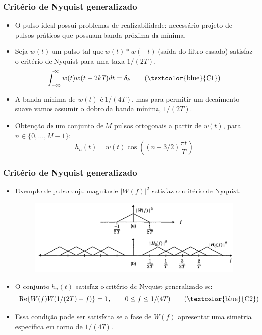 \begin{frame}
	\frametitle{Critério de Nyquist generalizado}

	\begin{itemize}
	    \item O pulso ideal possui problemas de realizabilidade: necessário projeto de pulsos práticos que possuam banda próxima da mínima.
	    \item Seja $w(t)$ um pulso tal que $w(t)*w(-t)$ (saída do filtro casado) satisfaz o critério de Nyquist para uma taxa $1/(2T)$.
	    \begin{equation*}
		\int_{-\infty}^{\infty} w(t) w(t-2kT)dt = \delta_k \qquad \text{(\textcolor{blue}{C1})}
	    \end{equation*}
	    \item A banda mínima de $w(t)$ é $1/(4T)$, mas para permitir um decaimento suave vamos assumir o dobro da banda mínima, $1/(2T)$.
	    \item Obtenção de um conjunto de $M$ pulsos ortogonais a partir de $w(t)$, para $n\in \{0,\ldots, M-1 \}$:
	    \begin{equation*}
		h_n(t) = w(t) \cos \left( (n+3/2) \frac{\pi t}{T} \right) 
	    \end{equation*}
	\end{itemize}	
\end{frame}

\begin{frame}
	\frametitle{Critério de Nyquist generalizado}

	\begin{itemize}
	    \item Exemplo de pulso cuja magnitude $|W(f)|^2$ satisfaz o critério de Nyquist:
	    \begin{figure}[t]	
		\begin{center}
		\includegraphics[width=0.8\columnwidth]{figs/adv_13}
		\end{center}
	    \end{figure}
	    \item O conjunto $h_n(t)$ satisfaz o critério de Nyquist generalizado se:
	    \begin{equation*}
		\mathrm{Re}\{W(f) W(1/(2T)-f) \} = 0 \, , \qquad 0 \leq f \leq 1/(4T) \qquad \text{(\textcolor{blue}{C2})}
	    \end{equation*}
	    \item Essa condição pode ser satisfeita se a fase de $W(f)$ apresentar uma simetria específica em torno de $1/(4T)$.
	\end{itemize}	
\end{frame}

